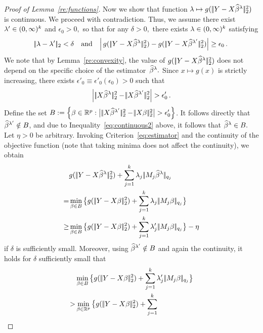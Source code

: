 \documentclass[bj]{imsart}
\newcommand{\normtwo}[1]{\ensuremath{\!|\!| #1 | \! |_{2}}}
\newcommand{\normqj}[1]{\ensuremath{\!|\!| #1 | \! |_{q_j}}}
\newcommand{\1}{{\rm 1}\mskip -4,5mu{\rm l} }
\def\R{\mathbb{R}}
\begin{document}
\begin{proof}[Proof of Lemma~\ref{re:functions}]
Now we show that function  $\lambda \mapsto g(\,\normtwo{\outcome-\design\estimatort}^2)$ is continuous.  We proceed with contradiction. Thus, we assume there exist $\lambda' \in (0,\infty)^{k}$ and $\epsilon_0 >0,$ so that for any $\delta>0,$ there exists $\lambda \in (0,\infty)^{k}$ satisfying
\begin{align*}
\normtwo{\lambda-\lambda'}<\delta \quad \text{and}\quad  \Big|\,g(\, \normtwo{\outcome-\design\estimatort}^2)-g(\, \normtwo{\outcome-\design\estimatortprime}^2)\Big|\ge \epsilon_0\,.
\end{align*}
We note that by Lemma~\ref{re:convexity}, the value of $g(\,\normtwo{\outcome-\design\estimatort}^2)$ does not depend on the specific  choice of the estimator~$\widehat \beta^{\lambda}.$ 
Since $x\mapsto g(x)$ is strictly increasing, there exists $\epsilon'_0\equiv \epsilon'_0(\epsilon_0)>0$ such that 
\begin{equation}
\label{eq:continuous2}
\Big|\,\normtwo{\design\estimatort}^2-\normtwo{\design\estimatortprime}^2\Big|>\epsilon'_0\, .
\end{equation} 
Define the set $B:=\left\{\beta\in\R^p: \big|\,\normtwo{\design\estimatortprime}^2-\normtwo{\design\beta}^2\big|>\epsilon'_0\right\}$. It follows directly that $\widehat \beta^{\lambda'}\notin B$, and due to Inequality~\eqref{eq:continuous2} above, it follows that $\widehat \beta^{\lambda}\in B.$ Let $\eta>0$ be arbitrary. Invoking Criterion~\eqref{eq:estimator} and the continuity of the objective function (note that taking minima does not affect the continuity), we obtain
\begin{align*}
&g(\,\normtwo{\outcome-\design\estimatort}^2)+\sum_{j=1}^\numbergroups\lambda_j\,\normqj{\fusedmatrix_j\estimatort}\\
=&\min_{\beta\in B}\big\{g(\,\normtwo{\outcome-\design\beta}^2)+\sum_{j=1}^\numbergroups
\lambda_j\,\normqj{\fusedmatrix_j\beta}\big\}\\
\geq &\min_{\beta\in B}\big\{g(\,\normtwo{\outcome-\design\beta}^2)+\sum_{j=1}^\numbergroups
\lambda'_j\,\normqj{\fusedmatrix_j\beta}\big\}-\eta
\end{align*}
if $\delta$ is sufficiently small. Moreover, using $\widehat \beta^{\lambda'}\notin B$ and again the continuity, it holds for $\delta$ sufficiently small that
\begin{align*}
& \min_{\beta\in B}\big\{g(\,\normtwo{\outcome-\design\beta}^2)+\sum_{j=1}^\numbergroups
\lambda'_j\,\normqj{\fusedmatrix_j\beta}\big\}\\
> & \min_{\beta\in \R^p}\big\{g(\,\normtwo{\outcome-\design\beta}^2)+\sum_{j=1}^\numbergroups

\end{align*}
\end{proof}
\end{document}
